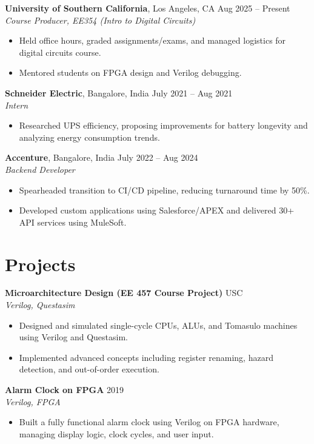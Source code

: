 \documentclass[letterpaper,10pt]{article}
\begin{document}
\textbf{University of Southern California}, Los Angeles, CA \hfill Aug 2025 -- Present \\
\textit{Course Producer, EE354 (Intro to Digital Circuits)}
\begin{itemize} \itemsep -2pt
    \item Held office hours, graded assignments/exams, and managed logistics for digital circuits course.
    \item Mentored students on FPGA design and Verilog debugging.
\end{itemize}

\textbf{Schneider Electric}, Bangalore, India \hfill July 2021 -- Aug 2021 \\
\textit{Intern}
\begin{itemize} \itemsep -2pt
    \item Researched UPS efficiency, proposing improvements for battery longevity and analyzing energy consumption trends.
\end{itemize}

\textbf{Accenture}, Bangalore, India \hfill July 2022 -- Aug 2024 \\
\textit{Backend Developer}
\begin{itemize} \itemsep -2pt
    \item Spearheaded transition to CI/CD pipeline, reducing turnaround time by 50\%.
    \item Developed custom applications using Salesforce/APEX and delivered 30+ API services using MuleSoft.
\end{itemize}

\section*{Projects}
\textbf{Microarchitecture Design (EE 457 Course Project)} \hfill USC \\
\textit{Verilog, Questasim}
\begin{itemize} \itemsep -2pt
    \item Designed and simulated single-cycle CPUs, ALUs, and Tomasulo machines using Verilog and Questasim.
    \item Implemented advanced concepts including register renaming, hazard detection, and out-of-order execution.
\end{itemize}

\textbf{Alarm Clock on FPGA} \hfill 2019 \\
\textit{Verilog, FPGA}
\begin{itemize} \itemsep -2pt
    \item Built a fully functional alarm clock using Verilog on FPGA hardware, managing display logic, clock cycles, and user input.
\end{itemize}
\end{document}
